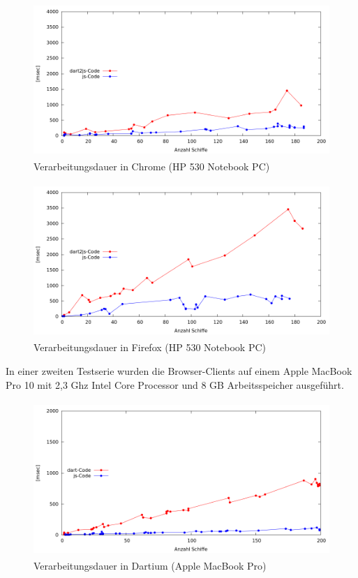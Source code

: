 \begin {figure}[H]
\begin{center}
  \includegraphics[height=2.3in]{images/Chrome.png}
\end{center}
 \caption{Verarbeitungsdauer in Chrome (HP 530 Notebook PC)}
\end {figure}


\begin {figure}[H]
\begin{center}
  \includegraphics[height=2.3in]{images/Firefox.png}
\end{center}
 \caption{Verarbeitungsdauer in Firefox (HP 530 Notebook PC)}
\end {figure}

In einer zweiten Testserie wurden die Browser-Clients auf einem Apple MacBook Pro 10 mit 2,3 Ghz Intel Core Processor und 8 GB Arbeitsspeicher ausgeführt.
 
\begin {figure}[H]
\begin{center}
  \includegraphics[height=2.3in]{images/DartiumOnMac.png}
\end{center}
 \caption{Verarbeitungsdauer in Dartium (Apple MacBook Pro)}
\end {figure}


